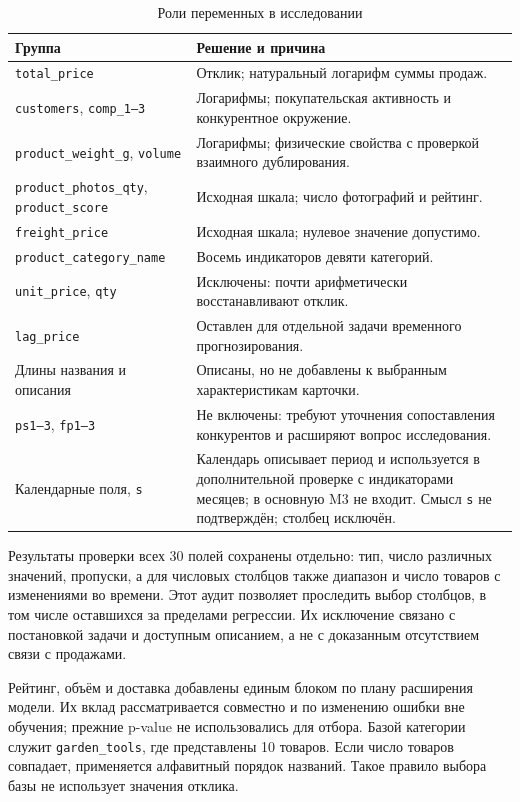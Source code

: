 \documentclass[14pt,a4paper]{extreport}
\begin{document}
\begin{table}[htbp]\centering\small\singlespacing
\caption{Роли переменных в исследовании}\label{tab:selection}
\begin{tabular}{p{}p{}}
\toprule Группа & Решение и причина \\\midrule
\texttt{total\_price} & Отклик; натуральный логарифм суммы продаж.\\
\texttt{customers}, \texttt{comp\_1--3} & Логарифмы; покупательская активность и конкурентное окружение.\\
\texttt{product\_weight\_g}, \texttt{volume} & Логарифмы; физические свойства с проверкой взаимного дублирования.\\
\texttt{product\_photos\_qty}, \texttt{product\_score} & Исходная шкала; число фотографий и рейтинг.\\
\texttt{freight\_price} & Исходная шкала; нулевое значение допустимо.\\
\texttt{product\_category\_name} & Восемь индикаторов девяти категорий.\\
\texttt{unit\_price}, \texttt{qty} & Исключены: почти арифметически восстанавливают отклик.\\
\texttt{lag\_price} & Оставлен для отдельной задачи временного прогнозирования.\\
Длины названия и описания & Описаны, но не добавлены к выбранным характеристикам карточки.\\
\texttt{ps1--3}, \texttt{fp1--3} & Не включены: требуют уточнения сопоставления конкурентов и расширяют вопрос исследования.\\
Календарные поля, \texttt{s} & Календарь описывает период и используется в дополнительной проверке с индикаторами месяцев; в основную M3 не входит. Смысл \texttt{s} не подтверждён; столбец исключён.\\
\bottomrule\end{tabular}\end{table}

Результаты проверки всех 30 полей сохранены отдельно: тип, число различных значений, пропуски, а для числовых столбцов также диапазон и число товаров с изменениями во времени. Этот аудит позволяет проследить выбор столбцов, в том числе оставшихся за пределами регрессии. Их исключение связано с постановкой задачи и доступным описанием, а не с доказанным отсутствием связи с продажами.

Рейтинг, объём и доставка добавлены единым блоком по плану расширения модели. Их вклад рассматривается совместно и по изменению ошибки вне обучения; прежние p-value не использовались для отбора. Базой категории служит \texttt{garden\_tools}, где представлены 10 товаров. Если число товаров совпадает, применяется алфавитный порядок названий. Такое правило выбора базы не использует значения отклика.
\end{document}
